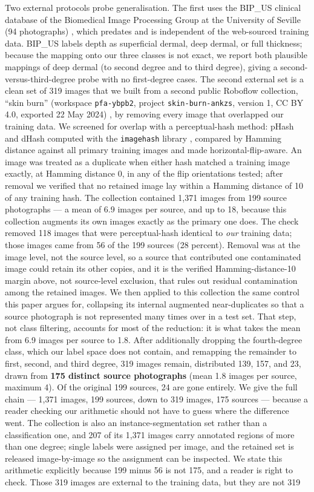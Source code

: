 \documentclass{melba}
\begin{document}
Two external protocols probe generalisation. The first uses the BIP\_US clinical database of the Biomedical Image Processing Group at the University of Seville (94 photographs) \citep{acha,rostami}, which predates and is independent of the web-sourced training data. BIP\_US labels depth as superficial dermal, deep dermal, or full thickness; because the mapping onto our three classes is not exact, we report both plausible mappings of deep dermal (to second degree and to third degree), giving a second-versus-third-degree probe with no first-degree cases. The second external set is a clean set of 319 images that we built from a second public Roboflow collection, ``skin burn'' (workspace \texttt{pfa-ybpb2}, project \texttt{skin-burn-ankzs}, version 1, CC BY 4.0, exported 22 May 2024) \citep{roboflow2}, by removing every image that overlapped our training data. We screened for overlap with a perceptual-hash method: pHash and dHash computed with the \texttt{imagehash} library \citep{zauner}, compared by Hamming distance against all primary training images and made horizontal-flip-aware. An image was treated as a duplicate when either hash matched a training image exactly, at Hamming distance 0, in any of the flip orientations tested; after removal we verified that no retained image lay within a Hamming distance of 10 of any training hash. The collection contained 1{,}371 images from 199 source photographs --- a mean of 6.9 images per source, and up to 18, because this collection augments its own images exactly as the primary one does. The check removed 118 images that were perceptual-hash identical to \emph{our} training data; those images came from 56 of the 199 sources (28 percent). Removal was at the image level, not the source level, so a source that contributed one contaminated image could retain its other copies, and it is the verified Hamming-distance-10 margin above, not source-level exclusion, that rules out residual contamination among the retained images. We then applied to this collection the same control this paper argues for, collapsing its internal augmented near-duplicates so that a source photograph is not represented many times over in a test set. That step, not class filtering, accounts for most of the reduction: it is what takes the mean from 6.9 images per source to 1.8. After additionally dropping the fourth-degree class, which our label space does not contain, and remapping the remainder to first, second, and third degree, 319 images remain, distributed 139, 157, and 23, drawn from \textbf{175 distinct source photographs} (mean 1.8 images per source, maximum 4). Of the original 199 sources, 24 are gone entirely. We give the full chain --- 1{,}371 images, 199 sources, down to 319 images, 175 sources --- because a reader checking our arithmetic should not have to guess where the difference went. The collection is also an instance-segmentation set rather than a classification one, and 207 of its 1{,}371 images carry annotated regions of more than one degree; single labels were assigned per image, and the retained set is released image-by-image so the assignment can be inspected. We state this arithmetic explicitly because 199 minus 56 is not 175, and a reader is right to check. Those 319 images are external to the training data, but they are not 319 
\end{document}
